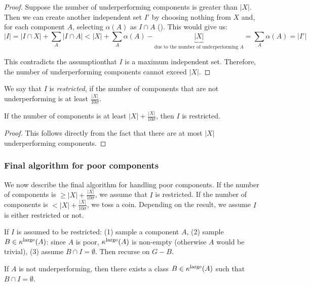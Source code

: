 \begin{proof}
    Suppose the number of underperforming components is greater than $|X|$. Then we can create another independent set $I'$ by choosing nothing from $X$ and, for each component $A$, selecting $\alpha(A)$ as $I \cap A$ (). This would give us:
    $$|I| = |I \cap X| + \sum_{A} |I \cap A| < |X| + \sum_{A} \alpha(A) - \underbrace{|X|}_{\text{due to the number of underperforming $A$}} = \sum_{A} \alpha(A) = |I'|$$

    This contradicts the assumptionthat $I$ is a maximum independent set. Therefore, the number of underperforming components cannot exceed $|X|$.
\end{proof}

We say that $I$ is \emph{restricted}, if the number of components that are not underperforming is at least $\frac{|X|}{10\sigma}$.

\begin{observation}
    If the number of components is at least $|X| + \frac{|X|}{10\sigma}$, then $I$ is restricted.
\end{observation}

\begin{proof}
    This follows directly from the fact that there are at most $|X|$ underperforming components.
\end{proof}

\subsubsection*{Final algorithm for poor components}

We now describe the final algorithm for handling poor components. If the number of components is $\geq |X| + \frac{|X|}{10\sigma}$, we assume that $I$ is restricted. If the number of components is $< |X| + \frac{|X|}{10\sigma}$, we toss a coin. Depending on the result, we assume $I$ is either restricted or not.

\medskip

If $I$ is assumed to be restricted: (1) sample a component $A$, (2) sample $B \in \kappa^\text{large}(A)$: since $A$ is poor, $\kappa^\text{large}(A)$ is non-empty (otherwise $A$ would be trivial), (3) assume $B \cap I = \emptyset$. Then recurse on $G - B$.

\begin{observation}
    If $A$ is not underperforming, then there exists a class $B \in \kappa^\text{large}(A)$ such that $B \cap I = \emptyset$.
\end{observation}

